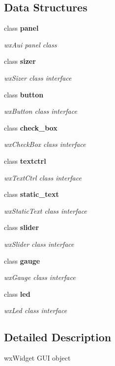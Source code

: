 \subsection*{Data Structures}
\begin{DoxyCompactItemize}
\item 
class \textbf{ panel}
\begin{DoxyCompactList}\small\item\em wx\+Aui panel class \end{DoxyCompactList}\item 
class \textbf{ sizer}
\begin{DoxyCompactList}\small\item\em wx\+Sizer class interface \end{DoxyCompactList}\item 
class \textbf{ button}
\begin{DoxyCompactList}\small\item\em wx\+Button class interface \end{DoxyCompactList}\item 
class \textbf{ check\+\_\+box}
\begin{DoxyCompactList}\small\item\em wx\+Check\+Box class interface \end{DoxyCompactList}\item 
class \textbf{ textctrl}
\begin{DoxyCompactList}\small\item\em wx\+Text\+Ctrl class interface \end{DoxyCompactList}\item 
class \textbf{ static\+\_\+text}
\begin{DoxyCompactList}\small\item\em wx\+Static\+Text class interface \end{DoxyCompactList}\item 
class \textbf{ slider}
\begin{DoxyCompactList}\small\item\em wx\+Slider class interface \end{DoxyCompactList}\item 
class \textbf{ gauge}
\begin{DoxyCompactList}\small\item\em wx\+Gauge class interface \end{DoxyCompactList}\item 
class \textbf{ led}
\begin{DoxyCompactList}\small\item\em wx\+Led class interface \end{DoxyCompactList}\end{DoxyCompactItemize}


\subsection{Detailed Description}
wx\+Widget G\+UI object 

